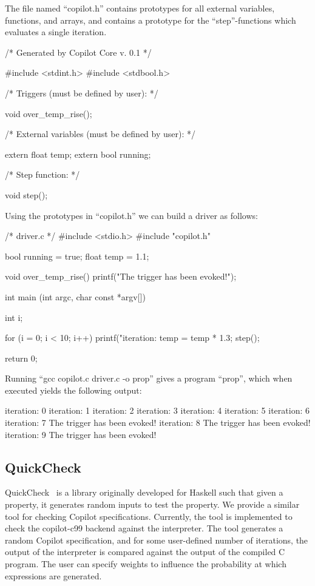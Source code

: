 \documentclass[]{article}
\theoremstyle{example}
\begin{document}
The file named ``copilot.h'' contains prototypes for all external variables, functions, and arrays,
and contains a prototype for the ``step''-functions which evaluates a single iteration.

\begin{code}
/* Generated by Copilot Core v. 0.1 */

#include <stdint.h>
#include <stdbool.h>

/* Triggers (must be defined by user): */

void over_temp_rise();

/* External variables (must be defined by user): */

extern float temp;
extern bool running;

/* Step function: */

void step();
\end{code}

Using the prototypes in ``copilot.h'' we can build a driver as follows:

\begin{code}
/* driver.c */
#include <stdio.h>
#include "copilot.h"

bool running = true;
float temp = 1.1;

void over_temp_rise()
{
  printf("The trigger has been evoked!\n");
}

int main (int argc, char const *argv[])
{
  int i;

  for (i = 0; i < 10; i++)
  {
    printf("iteration: %
    temp = temp * 1.3;
    step();
  }

  return 0;
}
\end{code}

Running ``gcc copilot.c driver.c -o prop'' gives a program ``prop'', which when executed
yields the following output:
%
\begin{code}
iteration: 0
iteration: 1
iteration: 2
iteration: 3
iteration: 4
iteration: 5
iteration: 6
iteration: 7
The trigger has been evoked!
iteration: 8
The trigger has been evoked!
iteration: 9
The trigger has been evoked!
\end{code}
%

\subsection{QuickCheck}
QuickCheck~\cite{qc} is a library originally developed for Haskell such that
given a property, it generates random inputs to test the property.  We provide a
similar tool for checking Copilot specifications.  Currently, the tool is
implemented to check the copilot-c99 backend against the interpreter.  The tool
generates a random Copilot specification, and for some user-defined number of
iterations, the output of the interpreter is compared against the output of the
compiled C program.  The user can specify weights to influence the probability
at which expressions are generated.
\end{document}
